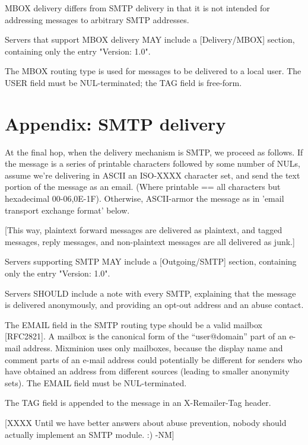 MBOX delivery differs from SMTP delivery in that it is not intended
for addressing messages to arbitrary SMTP addresses.

Servers that support MBOX delivery MAY include a [Delivery/MBOX]
section, containing only the entry "Version: 1.0".

The MBOX routing type is used for messages to be delivered to a local
user.  The USER field must be NUL-terminated; the TAG field is
free-form. 

\section{Appendix: SMTP delivery}

At the final hop, when the delivery mechanism is SMTP, we proceed as
follows.  If the message is a series of printable characters followed
by some number of NULs, assume we're delivering in ASCII an ISO-XXXX
character set, and send the text portion of the message as an email.
(Where printable == {all characters but hexadecimal 00-06,0E-1F}).
Otherwise, ASCII-armor the message as in 'email transport exchange
format' below.

[This way, plaintext forward messages are delivered as plaintext,
and tagged messages, reply messages, and non-plaintext messages are
all delivered as junk.]

Servers supporting SMTP MAY include a [Outgoing/SMTP] section,
containing only the entry "Version: 1.0".

Servers SHOULD include a note with every SMTP, explaining that the
message is delivered anonymously, and providing an opt-out address and
an abuse contact.

The EMAIL field in the SMTP routing type should be a valid mailbox
[RFC2821]. A mailbox is the canonical form of the ``user@domain''
part of an e-mail address. Mixminion uses only mailboxes, because the
display name and comment parts of an e-mail address could potentially be
different for senders who have obtained an address from different
sources (leading to smaller anonymity sets). The EMAIL field must be
NUL-terminated.

The TAG field is appended to the message in an X-Remailer-Tag header.

[XXXX Until we have better answers about abuse prevention, nobody should
  actually implement an SMTP module. :) -NM]

